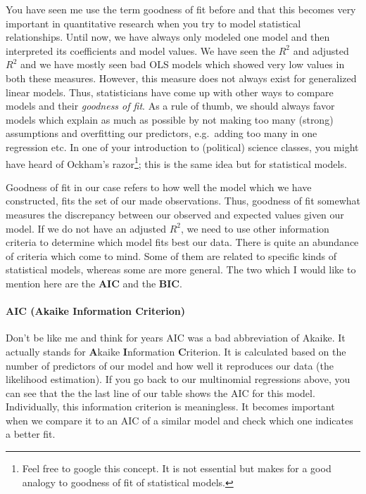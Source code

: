 \documentclass[
  letterpaper,
  DIV=11,
  numbers=noendperiod]{scrreprt}
\let\oldparagraph\paragraph
\renewcommand{\paragraph}[1]{\oldparagraph{#1}\mbox{}}
\begin{document}
You have seen me use the term goodness of fit before and that this
becomes very important in quantitative research when you try to model
statistical relationships. Until now, we have always only modeled one
model and then interpreted its coefficients and model values. We have
seen the \(R^2\) and adjusted \(R^2\) and we have mostly seen bad OLS
models which showed very low values in both these measures. However,
this measure does not always exist for generalized linear models. Thus,
statisticians have come up with other ways to compare models and their
\emph{goodness of fit}. As a rule of thumb, we should always favor
models which explain as much as possible by not making too many (strong)
assumptions and overfitting our predictors, e.g.~adding too many in one
regression etc. In one of your introduction to (political) science
classes, you might have heard of Ockham's
razor\footnote{Feel free to google this concept. It is not essential but makes for a good analogy to goodness of fit of statistical models.};
this is the same idea but for statistical models.

Goodness of fit in our case refers to how well the model which we have
constructed, fits the set of our made observations. Thus, goodness of
fit somewhat measures the discrepancy between our observed and expected
values given our model. If we do not have an adjusted \(R^2\), we need
to use other information criteria to determine which model fits best our
data. There is quite an abundance of criteria which come to mind. Some
of them are related to specific kinds of statistical models, whereas
some are more general. The two which I would like to mention here are
the \textbf{AIC} and the \textbf{BIC}.

\hypertarget{aic-akaike-information-criterion}{%
\paragraph{AIC (Akaike Information
Criterion)}\label{aic-akaike-information-criterion}}

Don't be like me and think for years AIC was a bad abbreviation of
Akaike. It actually stands for \textbf{A}kaike \textbf{I}nformation
\textbf{C}riterion. It is calculated based on the number of predictors
of our model and how well it reproduces our data (the likelihood
estimation). If you go back to our multinomial regressions above, you
can see that the the last line of our table shows the AIC for this
model. Individually, this information criterion is meaningless. It
becomes important when we compare it to an AIC of a similar model and
check which one indicates a better fit.
\end{document}

